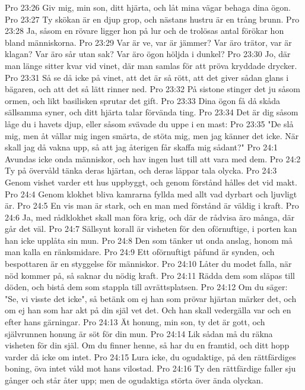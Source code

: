 Pro 23:26  Giv mig, min son, ditt hjärta, och låt mina vägar behaga dina ögon.
Pro 23:27  Ty skökan är en djup grop, och nästans hustru är en trång brunn.
Pro 23:28  Ja, såsom en rövare ligger hon på lur och de trolösas antal förökar hon bland människorna.
Pro 23:29  Var är ve, var är jämmer? Var äro trätor, var är klagan? Var äro sår utan sak? Var äro ögon höljda i dunkel?
Pro 23:30  Jo, där man länge sitter kvar vid vinet, där man samlas för att pröva kryddade drycker.
Pro 23:31  Så se då icke på vinet, att det är så rött, att det giver sådan glans i bägaren, och att det så lätt rinner ned.
Pro 23:32  På sistone stinger det ju såsom ormen, och likt basilisken sprutar det gift.
Pro 23:33  Dina ögon få då skåda sällsamma syner, och ditt hjärta talar förvända ting.
Pro 23:34  Det är dig såsom låge du i havets djup, eller såsom svävade du uppe i en mast:
Pro 23:35  "De slå mig, men åt vållar mig ingen smärta, de stöta mig, men jag känner det icke. När skall jag då vakna upp, så att jag återigen får skaffa mig sådant?"
Pro 24:1  Avundas icke onda människor, och hav ingen lust till att vara med dem.
Pro 24:2  Ty på övervåld tänka deras hjärtan, och deras läppar tala olycka.
Pro 24:3  Genom vishet varder ett hus uppbyggt, och genom förstånd hålles det vid makt.
Pro 24:4  Genom klokhet bliva kamrarna fyllda med allt vad dyrbart och ljuvligt är.
Pro 24:5  En vis man är stark, och en man med förstånd är väldig i kraft.
Pro 24:6  Ja, med rådklokhet skall man föra krig, och där de rådvisa äro många, där går det väl.
Pro 24:7  Sällsynt korall är visheten för den oförnuftige, i porten kan han icke upplåta sin mun.
Pro 24:8  Den som tänker ut onda anslag, honom må man kalla en ränksmidare.
Pro 24:9  Ett oförnuftigt påfund är synden, och bespottaren är en styggelse för människor.
Pro 24:10  Låter du modet falla, när nöd kommer på, så saknar du nödig kraft.
Pro 24:11  Rädda dem som släpas till döden, och bistå dem som stappla till avrättsplatsen.
Pro 24:12  Om du säger: "Se, vi visste det icke", så betänk om ej han som prövar hjärtan märker det, och om ej han som har akt på din själ vet det. Och han skall vedergälla var och en efter hans gärningar.
Pro 24:13  Ät honung, min son, ty det är gott, och självrunnen honung är söt för din mun.
Pro 24:14  Lik sådan må du räkna visheten för din själ. Om du finner henne, så har du en framtid, och ditt hopp varder då icke om intet.
Pro 24:15  Lura icke, du ogudaktige, på den rättfärdiges boning, öva intet våld mot hans vilostad.
Pro 24:16  Ty den rättfärdige faller sju gånger och står åter upp; men de ogudaktiga störta över ända olyckan.
